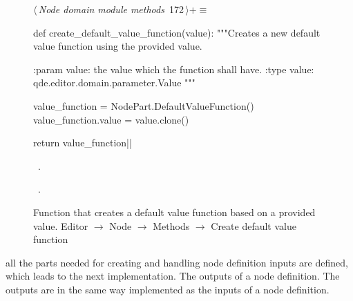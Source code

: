 \documentclass[%
    a4paper,    %
    justified,  %
    nobib,      %
    openany     %
]{tufte-book}
\makeatletter
\renewcommand{\label}[1]{\@tufte@label{##1}}%
\makeatother
\begin{document}
\begin{figure}[!htbp]
\begin{flushleft} \small
\begin{minipage}{\linewidth}\label{scrap142}\raggedright\small
{} $\langle\,${\itshape Node domain module methods}\nobreak\ {\footnotesize {172}}$\,\rangle+\equiv$
\vspace{-1ex}
\begin{pythoncode}
def create_default_value_function(value):
    """Creates a new default value function using the provided
    value.

    :param value: the value which the function shall have.
    :type  value: qde.editor.domain.parameter.Value
    """

    value_function = NodePart.DefaultValueFunction()
    value_function.value = value.clone()

    return value_function|\NWsep|
\end{pythoncode}
\vspace{1.5ex}
\footnotesize
\begin{list}{}{\setlength{\itemsep}{-\parsep}\setlength{\itemindent}{-\leftmargin}}
\item \NWtxtMacroDefBy\ .
\item \NWtxtMacroRefIn\ .

\item{}
\end{list}
\end{minipage}\vspace{4ex}
\end{flushleft}
\caption{Function that creates a default value function based on a provided
  value.
  \newline{}\newline{}Editor $\rightarrow$ Node $\rightarrow$
  Methods $\rightarrow$ Create default value function}
\end{figure}

 all the parts needed for creating and
handling node definition inputs are defined, which leads to the next
implementation. The outputs of a node definition. The outputs are in the same
way implemented as the inputs of a node definition.
\end{document}
